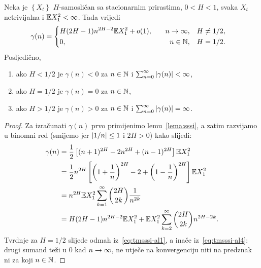 \documentclass[main.tex]{subfiles}
\begin{document}
\begin{teorem} \label{tm:sssi}
	Neka je \( \left\{ X_t \right\} \) \( H \)-samosličan sa stacionarnim prirastima, \( 0 < H < 1 \),
	svaka \( X_t \) netrivijalna i \( \mathbb{E} X_1^2 < \infty \). Tada vrijedi
	\begin{equation}
		\gamma(n)=  \begin{cases}\begin{aligned}
				 & H(2H-1)n^{2H-2}\mathbb{E} X_1^2 + o(1), & \quad n \rightarrow \infty,    & \quad H\neq 1/2, \\
				 & 0,                              & \quad n \in \mathbb{N}, & \quad H=1/2.
			\end{aligned}\end{cases}
	\end{equation}
	Posljedično,
	\begin{enumerate}[label=(\roman*)]
		\item ako \( H < 1/2 \) je \( \gamma(n) < 0 \) za \( n \in \mathbb{N} \) i \( \sum_{n=0}^\infty \left| {\gamma(n)} \right| < \infty \),
		\item ako \( H=1/2 \) je \( \gamma(n)=0 \) za \( n \in \mathbb{N} \),
		\item ako \( H>1/2 \) je \( \gamma(n) > 0\) za \( n \in \mathbb{N} \) i  \( \sum_{n=0}^\infty \left| {\gamma(n)} \right| = \infty \).
	\end{enumerate}
\end{teorem}

\begin{proof}
	Za izračunati \( \gamma(n) \) prvo primijenimo lemu~\ref{lema:sssi}, a zatim
	razvijamo u binomni red (smijemo jer \( \left| {1/n} \right| \le 1 \) i \( 2H > 0 \)) kako slijedi:
	\begin{align}
		\gamma(n) & = \frac 12 \left[ (n+1)^{2H} - 2n^{2H} + (n-1)^{2H} \right] \mathbb{E} X_1^2                                          \label{eq:tmsssi-al1} \\
		          & = \frac 12 n^{2H} \left[ \left( 1+\frac 1n \right)^{2H} - 2 + \left( 1-\frac 1n \right)^{2H} \right] \mathbb{E} X_1^2                       \\
		          & = n^{2H} \mathbb{E} X_1^2 \sum_{k=1}^\infty \binom{2H}{2k} \frac 1{n^{2k}}                                                                  \\
		          & = H(2H-1)n^{2H-2}\mathbb{E} X_1^2 + \mathbb{E} X_1^2 \sum_{k=2}^\infty \binom{2H}{2k}n^{2H-2k}.\label{eq:tmsssi-al4}
	\end{align}
	Tvrdnje za \( H=1/2 \) slijede odmah iz~\eqref{eq:tmsssi-al1}, a inače iz~\eqref{eq:tmsssi-al4}: drugi sumand teži u \( 0 \) kad \( n \rightarrow \infty \), ne utječe na konvergenciju niti na
	predznak ni za koji \( n \in \mathbb{N} \).

\end{proof}
\end{document}
